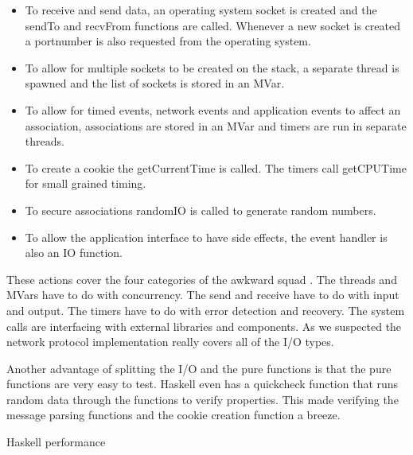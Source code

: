 \begin{itemize}
\item To receive and send data, an operating system socket is created and the sendTo and recvFrom functions are called. Whenever a new socket is created a portnumber is also requested from the operating system.
\item To allow for multiple sockets to be created on the stack, a separate thread is spawned and the list of sockets is stored in an MVar.
\item To allow for timed events, network events and application events to affect an association, associations are stored in an MVar and timers are run in separate threads.
\item To create a cookie the getCurrentTime is called. The timers call getCPUTime for small grained timing.
\item To secure associations randomIO is called to generate random numbers.
\item To allow the application interface to have side effects, the event handler is also an IO function.
\end{itemize}

These actions cover the four categories of the awkward squad \cite{jones_tackling_2009}. The threads and MVars have to do with concurrency. The send and receive have to do with input and output. The timers have to do with error detection and recovery. The system calls are interfacing with external libraries and components. As we suspected the network protocol implementation really covers all of the I/O types.


Another advantage of splitting the I/O and the pure functions is that the pure functions are very easy to test. Haskell even has a quickcheck function that runs random data through the functions to verify properties. This made verifying the message parsing functions and the cookie creation function a breeze.

Haskell performance \cite{epstein_haskell_????}

